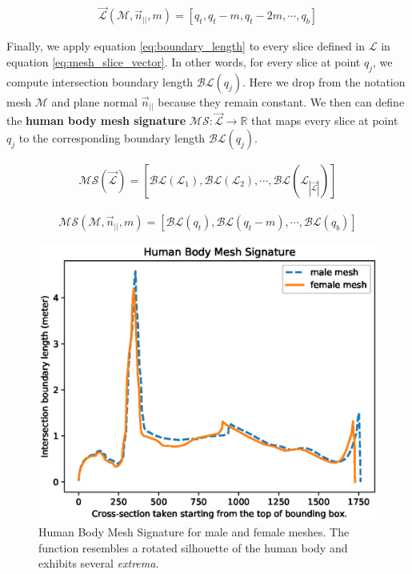 \documentclass[runningheads, orivec]{llncs}
\begin{document}
\begin{align}\label{eq:mesh_slice_vector}
\vec{\mathcal{L}}(\mathcal{M}, \vec{n}_{||}, m) = \left[ q_t, q_t-m, q_t-2 
m,\cdots, 
q_b \right]
\end{align}

Finally, we apply equation \ref{eq:boundary_length} to every slice defined in
$\mathcal{L}$ in equation \ref{eq:mesh_slice_vector}. In other words, for every 
slice at point 
$q_j$, we compute intersection boundary length $\mathcal{BL}(q_j)$. Here we 
drop from the notation mesh 
$\mathcal{M}$ and plane normal $\vec{n}_{||}$ because they remain constant. We 
then can 
define the \textbf{human body mesh signature} $\mathcal{MS}: 
\vec{\mathcal{L}} \to \mathbb{R}$ that maps every slice at point $q_j$ to the 
corresponding boundary length $\mathcal{BL}(q_j)$.

\begin{align}\label{eq:mesh_signature_short}
\mathcal{MS}(\vec{\mathcal{L}}) = [\mathcal{BL}(\mathcal{L}_1), 
\mathcal{BL}(\mathcal{L}_2), \cdots, 
\mathcal{BL}(\mathcal{L}_{|\vec{\mathcal{L}}|})]
\end{align}

\begin{align}\label{eq:mesh_signature}
\mathcal{MS}(\mathcal{M}, \vec{n}_{||}, m) = 
[\mathcal{BL}(q_t), \mathcal{BL}(q_t-m), \cdots, \mathcal{BL}(q_b)]
\end{align}

\begin{figure}[t]
	\begin{center}
		\includegraphics[width=\linewidth]{Figure_1.eps}
	\end{center}
	\caption{Human Body Mesh Signature for male and female meshes. The 
		function resembles a rotated silhouette of the human body and exhibits 
		several \textit{extrema}.}
	\label{fig:hbm_signature}
\end{figure}
\end{document}
